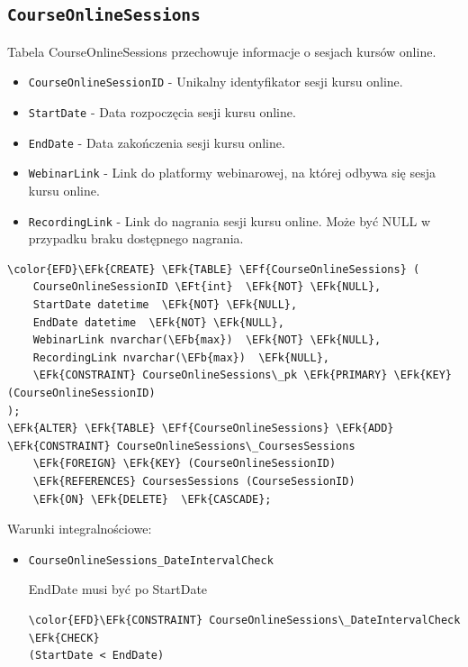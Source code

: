\documentclass[11pt]{article}
\newcommand{\EFk}[1]{\textcolor{EFk}{\textbf{#1}}} %
\newcommand{\EFb}[1]{\textcolor{EFb}{\textbf{#1}}} %
\newcommand{\EFf}[1]{\textcolor{EFf}{#1}} %
\newcommand{\EFt}[1]{\textcolor{EFt}{\textbf{#1}}} %
\begin{document}
\subsection{\texttt{CourseOnlineSessions}}
\label{sec:org1d30731}
Tabela CourseOnlineSessions przechowuje informacje o sesjach kursów online.
\begin{itemize}
\item \texttt{CourseOnlineSessionID} - Unikalny identyfikator sesji kursu online.
\item \texttt{StartDate} - Data rozpoczęcia sesji kursu online.
\item \texttt{EndDate} - Data zakończenia sesji kursu online.
\item \texttt{WebinarLink} - Link do platformy webinarowej, na której odbywa się sesja kursu online.
\item \texttt{RecordingLink} - Link do nagrania sesji kursu online. Może być NULL w przypadku braku dostępnego nagrania.
\end{itemize}
\begin{Code}
\begin{Verbatim}
\color{EFD}\EFk{CREATE} \EFk{TABLE} \EFf{CourseOnlineSessions} (
    CourseOnlineSessionID \EFt{int}  \EFk{NOT} \EFk{NULL},
    StartDate datetime  \EFk{NOT} \EFk{NULL},
    EndDate datetime  \EFk{NOT} \EFk{NULL},
    WebinarLink nvarchar(\EFb{max})  \EFk{NOT} \EFk{NULL},
    RecordingLink nvarchar(\EFb{max})  \EFk{NULL},
    \EFk{CONSTRAINT} CourseOnlineSessions\_pk \EFk{PRIMARY} \EFk{KEY}  (CourseOnlineSessionID)
);
\EFk{ALTER} \EFk{TABLE} \EFf{CourseOnlineSessions} \EFk{ADD} \EFk{CONSTRAINT} CourseOnlineSessions\_CoursesSessions
    \EFk{FOREIGN} \EFk{KEY} (CourseOnlineSessionID)
    \EFk{REFERENCES} CoursesSessions (CourseSessionID)
    \EFk{ON} \EFk{DELETE}  \EFk{CASCADE};
\end{Verbatim}
\end{Code}
Warunki integralnościowe:


\begin{itemize}
\item \texttt{CourseOnlineSessions\_DateIntervalCheck}

EndDate musi być po StartDate
\begin{Code}
\begin{Verbatim}
\color{EFD}\EFk{CONSTRAINT} CourseOnlineSessions\_DateIntervalCheck \EFk{CHECK}
(StartDate < EndDate)
\end{Verbatim}
\end{Code}
\end{itemize}
\end{document}
